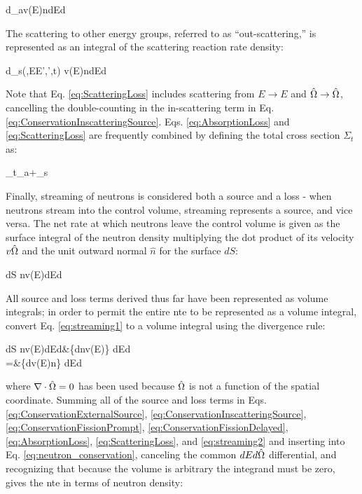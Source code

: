 \beq
\label{eq:AbsorptionLoss}
\left\lbrack\int d\volume \Sigma_a\seat v(E)n\seat\right\rbrack dEd\hO
\eeq

The scattering to other energy groups, referred to as ``out-scattering,'' is represented as an integral of the scattering reaction rate density:

\beq
\label{eq:ScatteringLoss}
\left\lbrack\int d\volume \Sigma_s(,E\rightarrow E',\hO\rightarrow\hO',t) v(E)n\seat\right\rbrack dEd\hO
\eeq

Note that Eq. \eqref{eq:ScatteringLoss} includes scattering from \(E\rightarrow E\) and \(\hat{\Omega}\rightarrow\hat{\Omega}\), cancelling the double-counting in the in-scattering term in Eq. \eqref{eq:ConservationInscatteringSource}. Eqs. \eqref{eq:AbsorptionLoss} and \eqref{eq:ScatteringLoss} are frequently combined by defining the total cross section \(\Sigma_t\) as:

\beq
\label{eq:TotalSigmaDef}
\Sigma_t\seatout\equiv\Sigma_a\seat+\Sigma_s\seatout
\eeq

Finally, streaming of neutrons is considered both a source and a loss - when neutrons stream into the control volume, streaming represents a source, and vice versa. The net rate at which neutrons leave the control volume is given as the surface integral of the neutron density multiplying the dot product of its velocity \(v\hat{\Omega}\) and the unit outward normal \(\hat{n}\) for the surface \(dS\):

\beq
\label{eq:streaming1}
\left\lbrack\int dS n\seat v(E)\hO\cdot{}\right\rbrack dEd\hO
\eeq

All source and loss terms derived thus far have been represented as volume integrals; in order to permit the entire \gls{nte} to be represented as a volume integral, convert Eq. \eqref{eq:streaming1} to a volume integral using the divergence rule:

\beqa
\label{eq:streaming2}
\left\lbrack\int dS n\seat v(E)\hO\cdot{}\right\rbrack dEd\hO\equiv&\left\{\int d\volume\nabla\cdot\left\lbrack n\seat v(E)\hO\right\rbrack\right\} dEd\hO\\
=&\left\{\int d\volume\hO\cdot \nabla\left\lbrack v(E)n\seat\right\rbrack\right\} dEd\hO
\eeqa

where \(\nabla\cdot\hat{\Omega}=0\) has been used because \(\hat{\Omega}\) is not a function of the spatial coordinate. Summing all of the source and loss terms in Eqs. \eqref{eq:ConservationExternalSource}, \eqref{eq:ConservationInscatteringSource}, \eqref{eq:ConservationFissionPrompt}, \eqref{eq:ConservationFissionDelayed}, \eqref{eq:AbsorptionLoss}, \eqref{eq:ScatteringLoss}, and \eqref{eq:streaming2} and inserting into Eq. \eqref{eq:neutron_conservation}, canceling the common \(dEd\hat{\Omega}\) differential, and recognizing that because the volume is arbitrary the integrand must be zero, gives the \gls{nte} in terms of neutron density:

